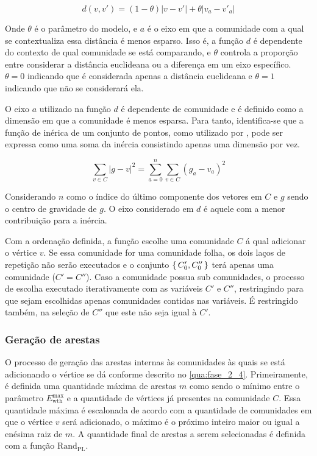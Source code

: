 \documentclass[notes.tex]{subfiles}
\begin{document}
\begin{equation}
d(v, v') = (1-\theta)|v-v'| + \theta|v_a - v'_a|
\end{equation}

Onde $\theta$ é o parâmetro do modelo, e  $a$ é o eixo em que a comunidade com a qual se contextualiza essa distância é menos esparso. 
Isso é, a função $d$ é dependente do contexto de qual comunidade se está comparando, e $\theta$ controla a proporção entre considerar a distância euclideana ou a diferença em um eixo específico.
$\theta = 0$ indicando que é considerada apenas a distância euclideana e $\theta = 1$ indicando que não se considerará ela.

O eixo $a$ utilizado na função $d$ é dependente de comunidade e é definido como a dimensão em que a comunidade é menos esparsa.
Para tanto, identifica-se que a função de inérica de um conjunto de pontos, como utilizado por , pode ser expressa como uma soma da inércia consistindo apenas uma dimensão por vez.

\begin{equation}
\sum_{v \in C} |g-v|^2 = \sum_{a=0}^{n}\sum_{v \in C}(g_a - v_a)^2
\end{equation}

Considerando $n$ como o índice do último componente dos vetores em $C$ e $g$ sendo o centro de gravidade de $g$.
O eixo considerado em $d$ é aquele com a menor contribuição para a inércia.

Com a ordenação definida, a função escolhe uma comunidade $C$ á qual adicionar o vértice $v$.
Se essa comunidade for uma comunidade folha, os dois laços de repetição não serão executados e o conjunto $\set{C'_0, C''_0}$ terá apenas uma comunidade ($C' = C''$).
Caso a comunidade possua sub comunidades, o processo de escolha executado iterativamente com as variáveis $C'$ e  $C''$, restringindo para que sejam escolhidas apenas comunidades contidas nas variáveis.
É restringido também, na seleção de $C''$ que este não seja igual à  $C'$.

\subsubsection{Geração de arestas}

O processo de geração das arestas internas às comunidades às quais se está adicionando o vértice se dá conforme descrito no \autoref{qua:fase_2_4}.
Primeiramente, é definida uma quantidade máxima de arestas $m$ como sendo o mínimo entre o parâmetro $E_\text{wth}^\text{max}$ e a quantidade de vértices já presentes na comunidade $C$.
Essa quantidade máxima é escalonada de acordo com a quantidade de comunidades em que o vértice $v$ será adicionado, o máximo é o próximo inteiro maior ou igual a enésima raiz de $m$.
A quantidade final de arestas a serem selecionadas é definida com a função $\text{Rand}_\text{PL}$.
\end{document}
